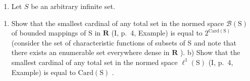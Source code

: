 \exercisegroup

\begin{enumerate}
\def\labelenumi{\arabic{enumi})}
\tightlist
\item
  Let \(S\) be an arbitrary infinite set.
\end{enumerate}

\begin{enumerate}
\def\labelenumi{\alph{enumi})}
\tightlist
\item
  Show that the smallest cardinal of any total set in the normed space \(\mathcal{B}(\mathrm{S})\) of bounded mappings of S in \(\mathbf{R}\) (I, p.~4, Example) is equal to \(2^{\mathrm{Card}(\mathrm{S})}\) (consider the set of characteristic functions of subsets of S and note that there exists an enumerable set everywhere dense in \(\mathbf{R}\) ). b) Show that the smallest cardinal of any total set in the normed space \(\ell^1 (\mathrm{S})\) (I, p.~4, Example) is equal to \(\mathrm{Card}(\mathrm{S})\) .
\end{enumerate}

